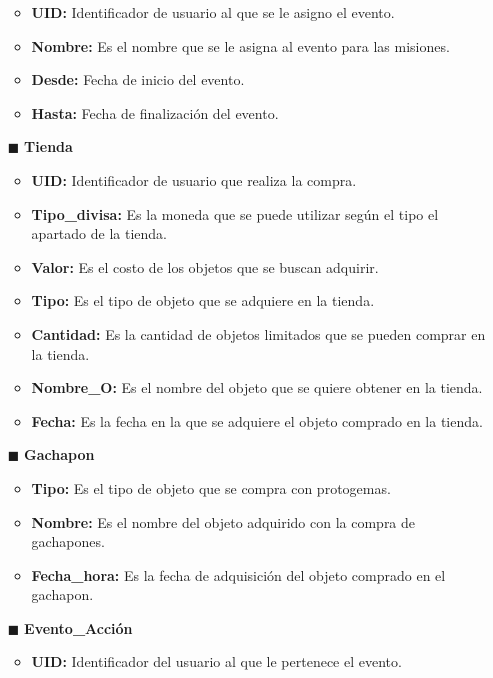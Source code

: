\documentclass{report}
\begin{document}
\begin{itemize}
        \begin{itemize}
            \item \textbf{UID:} Identificador de usuario al que se le asigno el evento.
            \item \textbf{Nombre:} Es el nombre que se le asigna al evento para las misiones.
            \item \textbf{Desde:} Fecha de inicio del evento.
            \item \textbf{Hasta:} Fecha de finalización del evento.
        \end{itemize}
    \item[$\blacksquare$]\textbf{Tienda}
        \begin{itemize}
            \item \textbf{UID:} Identificador de usuario que realiza la compra.
            \item \textbf{Tipo\_divisa:} Es la moneda que se puede utilizar según el tipo el apartado de la tienda.
            \item \textbf{Valor:} Es el costo de los objetos que se buscan adquirir.
            \item \textbf{Tipo:} Es el tipo de objeto que se adquiere en la tienda.
            \item \textbf{Cantidad:} Es la cantidad de objetos limitados que se pueden comprar en la tienda.
            \item \textbf{Nombre\_O:} Es el nombre del objeto que se quiere obtener en la tienda.
            \item \textbf{Fecha: } Es la fecha en la que se adquiere el objeto comprado en la tienda.
        \end{itemize}
    \item[$\blacksquare$]\textbf{Gachapon}
        \begin{itemize}
            \item \textbf{Tipo:} Es el tipo de objeto que se compra con protogemas.
            \item \textbf{Nombre: }Es el nombre del objeto adquirido con la compra de gachapones.
            \item \textbf{Fecha\_hora:} Es la fecha de adquisición del objeto comprado en el gachapon.
        \end{itemize}
    \item[$\blacksquare$]\textbf{Evento\_Acción}
        \begin{itemize}
            \item \textbf{UID:} Identificador del usuario al que le pertenece el evento.

\end{itemize}
\end{itemize}
\end{document}
